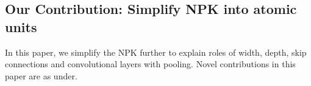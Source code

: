 \subsection{Our Contribution: Simplify NPK into atomic units}
 In this paper, we simplify the NPK further to explain roles of width, depth, skip connections and convolutional layers with pooling. Novel contributions in this paper are as under.

